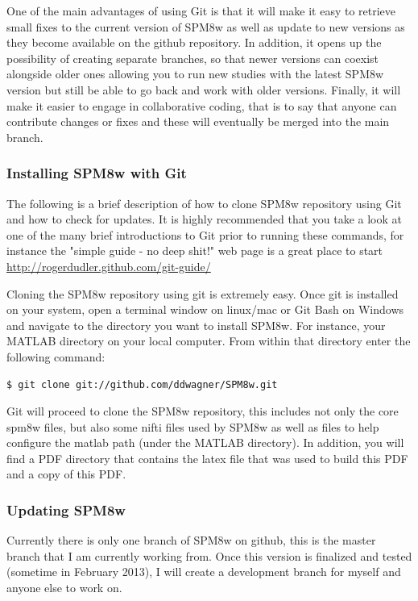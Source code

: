 \documentclass[12pt]{article}
\begin{document}
One of the main advantages of using Git is that it will make it easy to retrieve small fixes to the current version of SPM8w as well as update to new versions as they become available on the github repository. In addition, it opens up the possibility of creating separate branches, so that newer versions can coexist alongside older ones allowing you to run new studies with the latest SPM8w version but still be able to go back and work with older versions. Finally, it will make it easier to engage in collaborative coding, that is to say that anyone can contribute changes or fixes and these will eventually be merged into the main branch. 

\subsubsection{Installing SPM8w with Git}
The following is a brief description of how to clone SPM8w repository using Git and how to check for updates. It is highly recommended that you take a look at one of the many brief introductions to Git prior to running these commands, for instance the "simple guide - no deep shit!" web page is a great place to start  \url{ http://rogerdudler.github.com/git-guide/}

Cloning the SPM8w repository using git is extremely easy. Once git is installed on your system, open a terminal window on linux/mac or Git Bash on Windows and navigate to the directory you want to install SPM8w. For instance, your MATLAB directory on your local computer. From within that directory enter the following command:

\begin{lstlisting}
$ git clone git://github.com/ddwagner/SPM8w.git
\end{lstlisting}

Git will proceed to clone the SPM8w repository, this includes not only the core spm8w files, but also some nifti files used by SPM8w as well as files to help configure the matlab path (under the MATLAB directory). In addition, you will find a PDF directory that contains the latex file that was used to build this PDF and a copy of this PDF.  

\subsubsection{Updating SPM8w}
Currently there is only one branch of SPM8w on github, this is the master branch that I am currently working from. Once this version is finalized and tested (sometime in February 2013), I will create a development branch for myself and anyone else to work on. 
\end{document}
